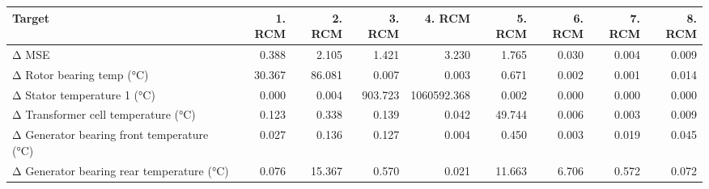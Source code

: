 \begin{tabular}{lrrrrrrrr}
\toprule
Target & 1. RCM & 2. RCM & 3. RCM & 4. RCM & 5. RCM & 6. RCM & 7. RCM & 8. RCM \\
\midrule
Δ MSE & 0.388 & 2.105 & 1.421 & 3.230 & 1.765 & 0.030 & 0.004 & 0.009 \\
Δ Rotor bearing temp (°C) & 30.367 & 86.081 & 0.007 & 0.003 & 0.671 & 0.002 & 0.001 & 0.014 \\
Δ Stator temperature 1 (°C) & 0.000 & 0.004 & 903.723 & 1060592.368 & 0.002 & 0.000 & 0.000 & 0.000 \\
Δ Transformer cell temperature (°C) & 0.123 & 0.338 & 0.139 & 0.042 & 49.744 & 0.006 & 0.003 & 0.009 \\
Δ Generator bearing front temperature (°C) & 0.027 & 0.136 & 0.127 & 0.004 & 0.450 & 0.003 & 0.019 & 0.045 \\
Δ Generator bearing rear temperature (°C) & 0.076 & 15.367 & 0.570 & 0.021 & 11.663 & 6.706 & 0.572 & 0.072 \\
\bottomrule
\end{tabular}
